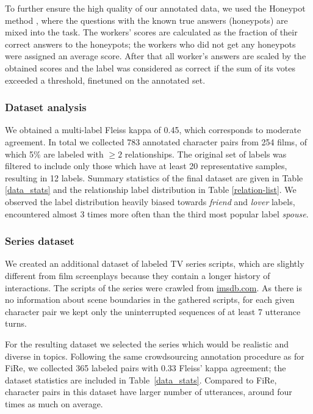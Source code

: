 To further ensure the high quality of our annotated data,
we used the Honeypot method \cite{lee2010social}, where the questions with the known true answers (honeypots) are mixed into the task. The workers' scores are calculated as the fraction of their correct answers to the honeypots; the workers who did not get any honeypots were assigned an average score. After that all worker's answers are scaled by the obtained scores and the label was considered as correct if the sum of its votes exceeded a threshold, finetuned on the annotated set.

\subsubsection{Dataset analysis}

We obtained a multi-label Fleiss kappa of 0.45, which corresponds to moderate agreement. In total we collected 783 annotated character pairs from 254 films, of which 5\% are labeled with $\ge 2$ relationships. The original set of labels was filtered to include only those which have at least 20 representative samples, resulting in 12 labels. Summary statistics of the final dataset are given in Table \ref{data_stats} and the relationship label distribution in Table \ref{relation-list}. We observed the label distribution heavily biased towards \emph{friend} and \emph{lover} labels, encountered almost 3 times more often than the third most popular label \emph{spouse}.

\subsubsection{Series dataset}

We created an additional dataset of labeled TV series scripts, which are slightly different from film screenplays because they contain a longer history of interactions. The scripts of the series were crawled from \url{imsdb.com}. As there is no information about scene boundaries in the gathered scripts, for each given character pair we kept only the uninterrupted sequences of at least 7 utterance turns. 

For the resulting dataset we selected the series which would be realistic and diverse in topics. Following the same crowdsourcing annotation procedure as for FiRe, we collected 365 labeled pairs with 0.33 Fleiss' kappa agreement; the dataset statistics are included in Table~\ref{data_stats}. Compared to FiRe, character pairs in this dataset have larger number of utterances, around four times as much on average.

